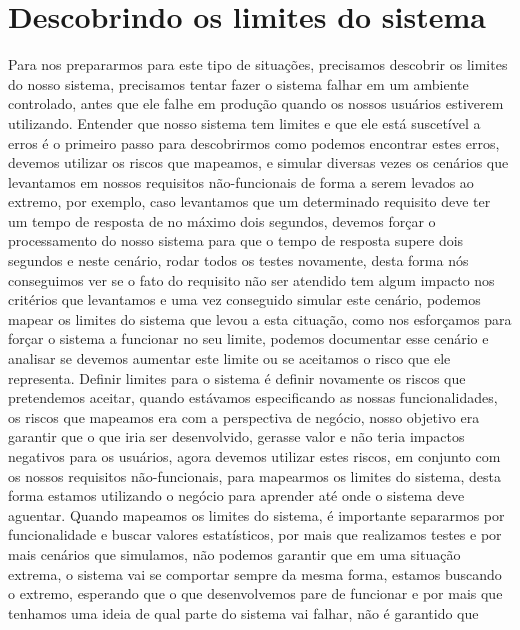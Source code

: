    \section{Descobrindo os limites do sistema}
      Para nos prepararmos para este tipo de situações, precisamos descobrir os
      limites do nosso sistema, precisamos tentar fazer o sistema falhar em um
      ambiente controlado, antes que ele falhe em produção quando os nossos usuários
      estiverem utilizando. Entender que nosso sistema tem limites e que ele está
      suscetível a erros é o primeiro passo para descobrirmos como podemos encontrar
      estes erros, devemos utilizar os riscos que mapeamos, e simular diversas vezes
      os cenários que levantamos em nossos requisitos não-funcionais de forma a
      serem levados ao extremo, por exemplo, caso levantamos que um determinado
      requisito deve ter um tempo de resposta de no máximo dois segundos, devemos
      forçar o processamento do nosso sistema para que o tempo de resposta supere
      dois segundos e neste cenário, rodar todos os testes novamente, desta forma nós
      conseguimos ver se o fato do requisito não ser atendido tem algum impacto nos
      critérios que levantamos e uma vez conseguido simular este cenário, podemos
      mapear os limites do sistema que levou a esta cituação, como nos esforçamos
      para forçar o sistema a funcionar no seu limite, podemos documentar esse cenário
      e analisar se devemos aumentar este limite ou se aceitamos o risco que ele
      representa. Definir limites para o sistema é definir novamente os riscos que
      pretendemos aceitar, quando estávamos especificando as nossas funcionalidades,
      os riscos que mapeamos era com a perspectiva de negócio, nosso objetivo era
      garantir que o que iria ser desenvolvido, gerasse valor e não teria impactos
      negativos para os usuários, agora devemos utilizar estes riscos, em conjunto
      com os nossos requisitos não-funcionais, para mapearmos os limites do sistema,
      desta forma estamos utilizando o negócio para aprender até onde o sistema
      deve aguentar. \newline
      Quando mapeamos os limites do sistema, é importante separarmos por funcionalidade
      e buscar valores estatísticos, por mais que realizamos testes e por mais
      cenários que simulamos, não podemos garantir que em uma situação extrema,
      o sistema vai se comportar sempre da mesma forma, estamos buscando o
      extremo, esperando que o que desenvolvemos pare de funcionar e por mais que
      tenhamos uma ideia de qual parte do sistema vai falhar, não é garantido que
